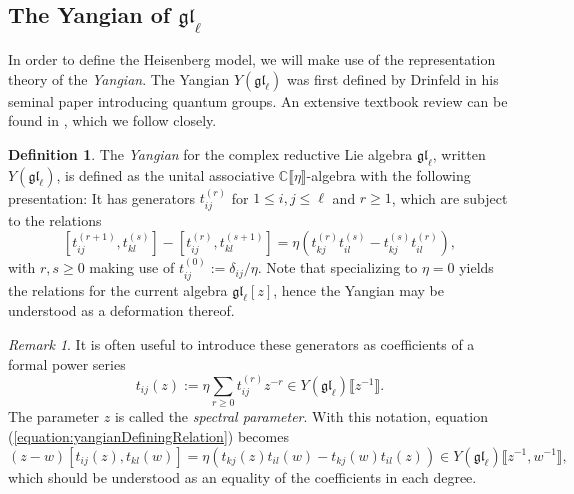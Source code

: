 \documentclass[11pt]{report}
\theoremstyle{definition}
\newtheorem{definition}[theorem]{Definition}
\theoremstyle{remark}
\newtheorem*{remark}{Remark}
\theoremstyle{remark}
\newcommand{\C}{\mathbb{C}}
\begin{document}
\subsection{The Yangian of $\mathfrak{gl}_\ell$}

In order to define the Heisenberg model, we will make use of the representation theory of the \emph{Yangian}. The Yangian $Y(\mathfrak{gl}_\ell)$ was first defined by Drinfeld in his seminal paper \cite{article:drinfeld:1985} introducing quantum groups. An extensive textbook review can be found in \cite{book:molev}, which we follow closely.

\begin{definition}
The \emph{Yangian} for the complex reductive Lie algebra $\mathfrak{gl}_\ell$, written $Y(\mathfrak{gl}_\ell)$, is defined as the unital associative $\C\llbracket\eta\rrbracket$-algebra with the following presentation: It has generators $t_{ij}^{(r)}$ for $1 \leq i,j \leq \ell$ and $r \geq 1$, which are subject to the relations
\begin{equation}\label{equation:yangianDefiningRelation}
[t_{ij}^{(r+1)},t_{kl}^{(s)}] - [t_{ij}^{(r)},t_{kl}^{(s+1)}] = \eta(t_{kj}^{(r)} t_{il}^{(s)} - t_{kj}^{(s)} t_{il}^{(r)}),
\end{equation}
with $r,s \geq 0$ making use of $t_{ij}^{(0)} := \delta_{ij}/\eta$. Note that specializing to $\eta = 0$ yields the relations for the current algebra $\mathfrak{gl}_\ell[z]$, hence the Yangian may be understood as a deformation thereof.
\end{definition}

\begin{remark}
It is often useful to introduce these generators as coefficients of a formal power series
\begin{equation*}
t_{ij}(z) := \eta \sum_{r \geq 0} t_{ij}^{(r)} z^{-r} \in Y(\mathfrak{gl}_\ell)\llbracket z^{-1} \rrbracket.
\end{equation*}
The parameter $z$ is called the \emph{spectral parameter}. With this notation, equation (\ref{equation:yangianDefiningRelation}) becomes
\begin{equation}\label{equation:yangianDefiningRelationUV}
(z-w) [t_{ij}(z),t_{kl}(w)] = \eta(t_{kj}(z) t_{il}(w) - t_{kj}(w) t_{il}(z)) \in Y(\mathfrak{gl}_\ell)\llbracket z^{-1},w^{-1} \rrbracket,
\end{equation}
which should be understood as an equality of the coefficients in each degree.
\end{remark}
\end{document}
